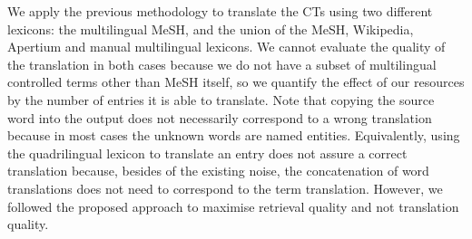 \documentclass[a4paper,11pt]{article}
\begin{document}
\bigskip
We apply the previous methodology to translate the CTs using two different lexicons: the multilingual MeSH, and the union of the MeSH, Wikipedia, Apertium and manual multilingual lexicons. We cannot evaluate the quality of the translation in both cases because we do not have a subset of multilingual controlled terms other than MeSH itself, so we quantify the effect of our resources by the number of entries it is able to translate. Note that copying the source word into the output does not necessarily correspond to a wrong translation because in most cases the unknown words are named entities. Equivalently, using the quadrilingual lexicon to translate an entry does not assure a correct translation because, besides of the existing noise, the concatenation of word translations does not need to correspond to the term translation. However, we followed the proposed approach to maximise retrieval quality and not translation quality. 
\end{document}
